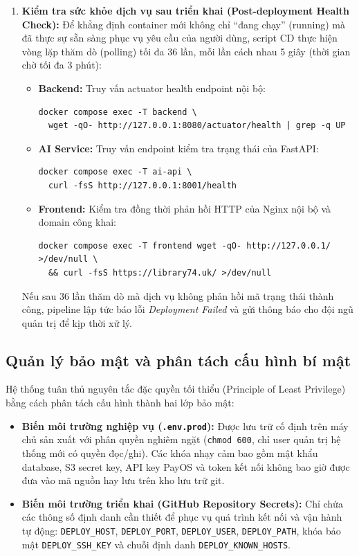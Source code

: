 \begin{enumerate}
    \item \textbf{Kiểm tra sức khỏe dịch vụ sau triển khai (Post-deployment Health Check):}
    Để khẳng định container mới không chỉ ``đang chạy'' (running) mà đã thực sự sẵn sàng phục vụ yêu cầu của người dùng, script CD thực hiện vòng lặp thăm dò (polling) tối đa 36 lần, mỗi lần cách nhau 5 giây (thời gian chờ tối đa 3 phút):
    \begin{itemize}[noitemsep]
        \item \textbf{Backend:} Truy vấn actuator health endpoint nội bộ:
\begin{verbatim}
docker compose exec -T backend \
  wget -qO- http://127.0.0.1:8080/actuator/health | grep -q UP
\end{verbatim}
        \item \textbf{AI Service:} Truy vấn endpoint kiểm tra trạng thái của FastAPI:
\begin{verbatim}
docker compose exec -T ai-api \
  curl -fsS http://127.0.0.1:8001/health
\end{verbatim}
        \item \textbf{Frontend:} Kiểm tra đồng thời phản hồi HTTP của Nginx nội bộ và domain công khai:
\begin{verbatim}
docker compose exec -T frontend wget -qO- http://127.0.0.1/ >/dev/null \
  && curl -fsS https://library74.uk/ >/dev/null
\end{verbatim}
    \end{itemize}
    Nếu sau 36 lần thăm dò mà dịch vụ không phản hồi mã trạng thái thành công, pipeline lập tức báo lỗi \textit{Deployment Failed} và gửi thông báo cho đội ngũ quản trị để kịp thời xử lý.
\end{enumerate}

\subsection{Quản lý bảo mật và phân tách cấu hình bí mật}

Hệ thống tuân thủ nguyên tắc đặc quyền tối thiểu (Principle of Least Privilege) bằng cách phân tách cấu hình thành hai lớp bảo mật:
\begin{itemize}
    \item \textbf{Biến môi trường nghiệp vụ (\texttt{.env.prod}):} Được lưu trữ cố định trên máy chủ sản xuất với phân quyền nghiêm ngặt (\texttt{chmod 600}, chỉ user quản trị hệ thống mới có quyền đọc/ghi). Các khóa nhạy cảm bao gồm mật khẩu database, S3 secret key, API key PayOS và token kết nối không bao giờ được đưa vào mã nguồn hay lưu trên kho lưu trữ git.
    \item \textbf{Biến môi trường triển khai (GitHub Repository Secrets):} Chỉ chứa các thông số định danh cần thiết để phục vụ quá trình kết nối và vận hành tự động: \texttt{DEPLOY\_HOST}, \texttt{DEPLOY\_PORT}, \texttt{DEPLOY\_USER}, \texttt{DEPLOY\_PATH}, khóa bảo mật \texttt{DEPLOY\_SSH\_KEY} và chuỗi định danh \texttt{DEPLOY\_KNOWN\_HOSTS}.
\end{itemize}

